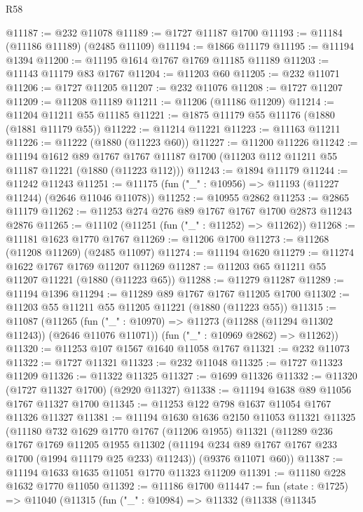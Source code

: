 \begin{lexlean}{R58}
\begin{coremodule}
@11187 := @232 @11078
@11189 := @1727 @11187 @1700
@11193 := @11184 (@11186 @11189) (@2485 @11109)
@11194 := @1866 @11179
@11195 := @11194 @1394
@11200 := @11195 @1614 @1767 @1769 @11185 @11189
@11203 := @11143 @11179 @83 @1767
@11204 := @11203 @60
@11205 := @232 @11071
@11206 := @1727 @11205
@11207 := @232 @11076
@11208 := @1727 @11207
@11209 := @11208 @11189
@11211 := @11206 (@11186 @11209)
@11214 := @11204 @11211 @55 @11185
@11221 := @1875 @11179 @55 @11176 (@1880 (@1881 @11179 @55))
@11222 := @11214 @11221
@11223 := @11163 @11211
@11226 := @11222 (@1880 (@11223 @60))
@11227 := @11200 @11226
@11242 := @11194
    @1612
    @89
    @1767
    @1767
    @11187
    @1700
    (@11203 @112 @11211 @55 @11187 @11221 (@1880 (@11223 @112)))
@11243 := @1894 @11179
@11244 := @11242 @11243
@11251 := @11175 (fun ("_" : @10956) => @11193 (@11227 @11244) (@2646 @11046 @11078))
@11252 := @10955 @2862
@11253 := @2865 @11179
@11262 := @11253 @274 @276 @89 @1767 @1767 @1700 @2873 @11243 @2876
@11265 := @11102 (@11251 (fun ("_" : @11252) => @11262))
@11268 := @11181 @1623 @1770 @1767
@11269 := @11206 @1700
@11273 := @11268 (@11208 @11269) (@2485 @11097)
@11274 := @11194 @1620
@11279 := @11274 @1622 @1767 @1769 @11207 @11269
@11287 := @11203 @65 @11211 @55 @11207 @11221 (@1880 (@11223 @65))
@11288 := @11279 @11287
@11289 := @11194 @1396
@11294 := @11289 @89 @1767 @1767 @11205 @1700
@11302 := @11203 @55 @11211 @55 @11205 @11221 (@1880 (@11223 @55))
@11315 := @11087
    (@11265
      (fun ("_" : @10970) => @11273 (@11288 (@11294 @11302 @11243)) (@2646 @11076 @11071))
      (fun ("_" : @10969 @2862) => @11262))
@11320 := @11253 @107 @1567 @1640 @11058 @1767
@11321 := @232 @11073
@11322 := @1727 @11321
@11323 := @232 @11048
@11325 := @1727 @11323 @11209
@11326 := @11322 @11325
@11327 := @1699 @11326
@11332 := @11320 (@1727 @11327 @1700) (@2920 @11327)
@11338 := @11194 @1638 @89 @11056 @1767 @11327 @1700
@11345 := @11253 @122 @798 @1637 @11054 @1767 @11326 @11327
@11381 := @11194
    @1630
    @1636
    @2150
    @11053
    @11321
    @11325
    (@11180
      @732
      @1629
      @1770
      @1767
      (@11206 @1955)
      @11321
      (@11289
        @236
        @1767
        @1769
        @11205
        @1955
        @11302
        (@11194 @234 @89 @1767 @1767 @233 @1700 (@1994 @11179 @25 @233) @11243))
      (@9376 @11071 @60))
@11387 := @11194 @1633 @1635 @11051 @1770 @11323 @11209
@11391 := @11180 @228 @1632 @1770 @11050
@11392 := @11186 @1700
@11447 := fun (state : @1725) =>
  @11040
    (@11315
      (fun ("_" : @10984) =>
      @11332
        (@11338
          (@11345

\end{coremodule}
\end{lexlean}
